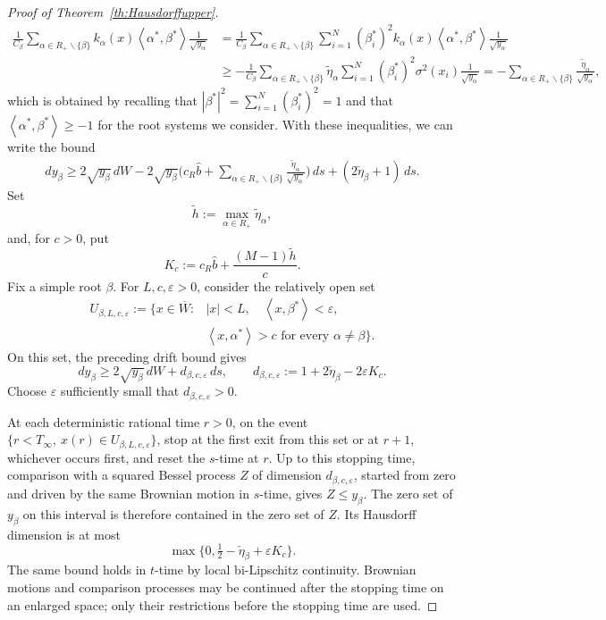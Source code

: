 \documentclass{article}
\numberwithin{equation}{section}
\newcommand{\inner}[2]{\left<#1,#2\right>}
\newcommand{\xas}{\left<x,\alpha^*\right>}
\newcommand{\xbs}{\left<x,\beta^*\right>}
\newcommand{\aR}{\alpha\in R_+}
\newcommand{\SaRnb}{\sum_{\aR\backslash\{\beta\}}}
\newcommand{\Sni}{\sum_{i=1}^N}
\newcommand{\abs}{\left<\alpha^*,\beta^*\right>}
\theoremstyle{plain}
\begin{document}
\begin{proof}[Proof of Theorem~\ref{th:Hausdorffupper}]
\begin{align*}
            \frac{1}{C_\beta}\SaRnb k_\alpha(x)\inner{\alpha^*}{\beta^*}\frac{1}{\sqrt{y_\alpha}}&=\frac1{C_\beta}\SaRnb \Sni(\beta_i^*)^2k_\alpha(x)\inner{\alpha^*}{\beta^*}\frac{1}{\sqrt{y_\alpha}}\\
            &\geq -\frac1{C_\beta}\SaRnb \tilde{\eta}_\alpha\Sni(\beta_i^*)^2\sigma^2(x_i)\frac{1}{\sqrt{y_\alpha}}=-\SaRnb \frac{\tilde{\eta}_\alpha}{\sqrt{y_\alpha}},
        \end{align*}   
        which is obtained by recalling that $|\beta^*|^2=\Sni(\beta_i^*)^2=1$ and that $\abs\geq-1$ for the root systems we consider.
        With these inequalities, we can write the bound
        \begin{align}
            dy_\beta\geq2\sqrt{y_\beta}\, dW-2\sqrt{y_\beta}\bigg(c_R \hat b+\SaRnb \frac{\tilde\eta_\alpha}{\sqrt{y_\alpha}}\bigg)\, ds +(2\check\eta_\beta+1)\,ds.\label{eq:sdenewlowerbound}
        \end{align}
        Set
\begin{equation}
 \widetilde h:=\max_{\alpha\in R_+}\widetilde\eta_\alpha,
 \label{eq:htilde}
\end{equation}
and, for $c>0$, put
\[
 K_c:=c_R\hat b+\frac{(M-1)\widetilde h}{c}.
\]
Fix a simple root $\beta$. For $L,c,\varepsilon>0$, consider the relatively open set
\[
\begin{split}
 U_{\beta,L,c,\varepsilon}:=\{x\in\overline W:
 &|x|<L,\quad \xbs<\varepsilon,\\
 &\xas>c\text{ for every }\alpha\ne\beta\}.
\end{split}
\]
On this set, the preceding drift bound gives
\[
 dy_\beta\geq2\sqrt{y_\beta}\,dW+
 d_{\beta,c,\varepsilon}\,ds,
 \qquad
 d_{\beta,c,\varepsilon}:=1+2\check\eta_\beta-2\varepsilon K_c.
\]
Choose $\varepsilon$ sufficiently small that $d_{\beta,c,\varepsilon}>0$.

At each deterministic rational time $r>0$, on the event
$\{r<T_\infty,\ x(r)\in U_{\beta,L,c,\varepsilon}\}$, stop at the first exit from this set or at $r+1$, whichever occurs first, and reset the $s$-time at $r$. Up to this stopping time, comparison with a squared Bessel process $Z$ of dimension $d_{\beta,c,\varepsilon}$, started from zero and driven by the same Brownian motion in $s$-time, gives $Z\leq y_\beta$. The zero set of $y_\beta$ on this interval is therefore contained in the zero set of $Z$. Its Hausdorff dimension is at most
\[
 \max\{0,\tfrac12-\check\eta_\beta+\varepsilon K_c\}.
\]
The same bound holds in $t$-time by local bi-Lipschitz continuity. Brownian motions and comparison processes may be continued after the stopping time on an enlarged space; only their restrictions before the stopping time are used.


\end{proof}
\end{document}
